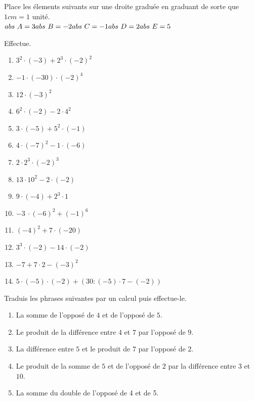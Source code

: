 \documentclass[parskip=half-, 12pt, DIV=15, twoside=semi]{scrbook}
\begin{document}
\begin{exercise}
    Place les élements suivants sur une droite graduée en graduant de sorte que $1cm = 1$ unité. \\

    $\hfil abs~A = 3 \hfil abs~B=-2 \hfil abs~C=-1 \hfil abs~D=2 \hfil abs~E=5$
\end{exercise}

\begin{exercise}
    Effectue.
    \begin{enumerate}[itemsep=.4cm, cols=2]
        \item   \(3^{2} \cdot ( - 3) + 2^{3} \cdot ( - 2)^{2} \)
        \item \(- 1 \cdot ( - 30) \cdot ( - 2)^{4} \)
        \item \(12 \cdot ( - 3)^{2} \)
        \item \(6^{2} \cdot ( - 2) - 2 \cdot 4^{2} \)
        \item \(3 \cdot ( - 5) + 5^{2} \cdot ( - 1) \)
        \item \(4 \cdot ( - 7)^{2} - 1 \cdot ( - 6) \)
        \item \(2 \cdot  2^{3} \cdot ( - 2)^{3} \)
        \item \(13 \cdot 10^{2} - 2 \cdot ( - 2) \)
        \item \(9 \cdot ( - 4) + 2^{3} \cdot 1 \)
        \item \(- 3\  \cdot ( - 6)^{2} + ( - 1)^{6} \)
        \item \( ( - 4)^{2} + 7 \cdot ( - 20) \)
        \item \(3^{3} \cdot ( - 2) - 14 \cdot ( - 2) \)
        \item \(-7 + 7 \cdot 2 - (-3)^2\)
        \item \(5 \cdot (-5) \cdot (-2) + \left(30:(-5)\cdot7- (-2)\right)\)
    \end{enumerate}
\end{exercise}

\begin{exercise}
    Traduis les phrases suivantes par un calcul puis effectue-le.
    \begin{enumerate}[itemsep=.3cm]
        \item La somme de l'opposé de \(4\) et de l'opposé de \(5\).
        \item Le produit de la différence entre \(4\) et \(7\) par l'opposé de \(9\).
        \item La différence entre \(5\) et le produit de \(7\) par l'opposé de \(2\).
        \item Le produit de la somme de \(5\) et de l'opposé de \(2\) par la différence entre \(3\) et \(10.\)
        \item La somme du double de l'opposé de 4 et de 5.
    \end{enumerate}
\end{exercise}
\end{document}
